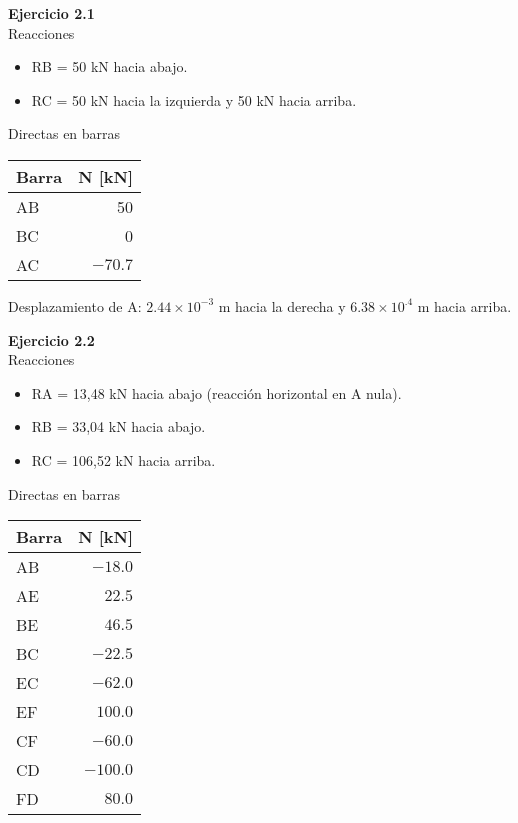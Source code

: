 \textbf{Ejercicio 2.1}\\

%
Reacciones
\begin{itemize}
\item RB = 50 kN hacia abajo.
\item RC = 50 kN hacia la izquierda y 50 kN hacia arriba.
\end{itemize}


Directas en barras
\begin{center}
\begin{tabular}{lr}
\hline
Barra & N [kN] \\
\hline
AB & 50 \\
BC & 0 \\
AC & $-70.7$\\
\hline
\end{tabular}
\end{center}

Desplazamiento de A: $2.44 \times  10^{-3}$ m hacia la derecha y $6.38 \times 10^{.4}$ m hacia arriba.\newline


\textbf{Ejercicio 2.2}\\

Reacciones
\begin{itemize}
\item RA = 13,48 kN hacia abajo (reacción horizontal en A nula).
\item RB = 33,04 kN hacia abajo.
\item  RC = 106,52 kN hacia arriba.
\end{itemize}

Directas en barras
\begin{center}
	\begin{tabular}{lr}
		\hline
Barra & N [kN] \\
\hline
AB & $-18.0$ \\
AE & $22.5$ \\
BE & $46.5$ \\
BC & $-22.5$ \\
EC & $-62.0$ \\
EF & $100.0$ \\
CF & $-60.0$ \\
CD & $-100.0$ \\
FD & $80.0$ \\
\hline
\end{tabular}
\end{center}


